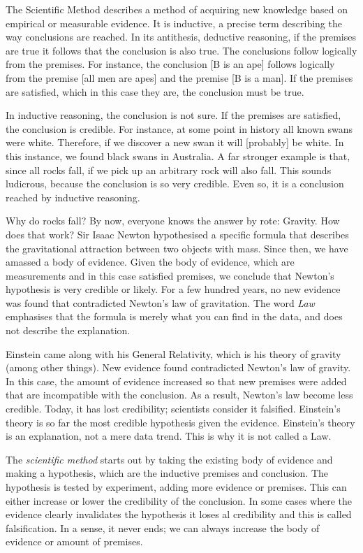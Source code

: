 \begin{multicols}{2}
The Scientific Method describes a method of acquiring new knowledge based on empirical or measurable evidence. It is inductive, a precise term describing the way conclusions are reached. In its antithesis, deductive reasoning, if the premises are true it follows that the conclusion is also true. The conclusions follow logically from the premises. For instance, the conclusion [B is an ape] follows logically from the premise [all men are apes] and the premise [B is a man]. If the premises are satisfied, which in this case they are, the conclusion must be true.

In inductive reasoning, the conclusion is not sure. If the premises are satisfied, the conclusion is credible. For instance, at some point in history all known swans were white. Therefore, if we discover a new swan it will [probably] be white. In this instance, we found black swans in Australia. A far stronger example is that, since all rocks fall, if we pick up an arbitrary rock will also fall. This sounds ludicrous, because the conclusion is so very credible. Even so, it is a conclusion reached by inductive reasoning.

Why do rocks fall? By now, everyone knows the answer by rote: Gravity. How does that work? Sir Isaac Newton hypothesised a specific formula that describes the gravitational attraction between two objects with mass. Since then, we have amassed a body of evidence. Given the body of evidence, which are measurements and in this case satisfied premises, we conclude that Newton's hypothesis is very credible or likely. For a few hundred years, no new evidence was found that contradicted Newton's law of gravitation. The word \emph{Law} emphasises that the formula is merely what you can find in the data, and does not describe the explanation.

Einstein came along with his General Relativity, which is his theory of gravity (among other things). New evidence found contradicted Newton's law of gravity. In this case, the amount of evidence increased so that new premises were added that are incompatible with the conclusion. As a result, Newton's law become less credible. Today, it has lost credibility; scientists consider it falsified. Einstein's theory is so far the most credible hypothesis given the evidence. Einstein's theory is an explanation, not a mere data trend. This is why it is not called a Law. 

The \emph{scientific method} starts out by taking the existing body of evidence and making a hypothesis, which are the inductive premises and conclusion. The hypothesis is tested by experiment, adding more evidence or premises. This can either increase or lower the credibility of the conclusion. In some cases where the evidence clearly invalidates the hypothesis it loses al credibility and this is called falsification. In a sense, it never ends; we can always increase the body of evidence or amount of premises.


\end{multicols}
